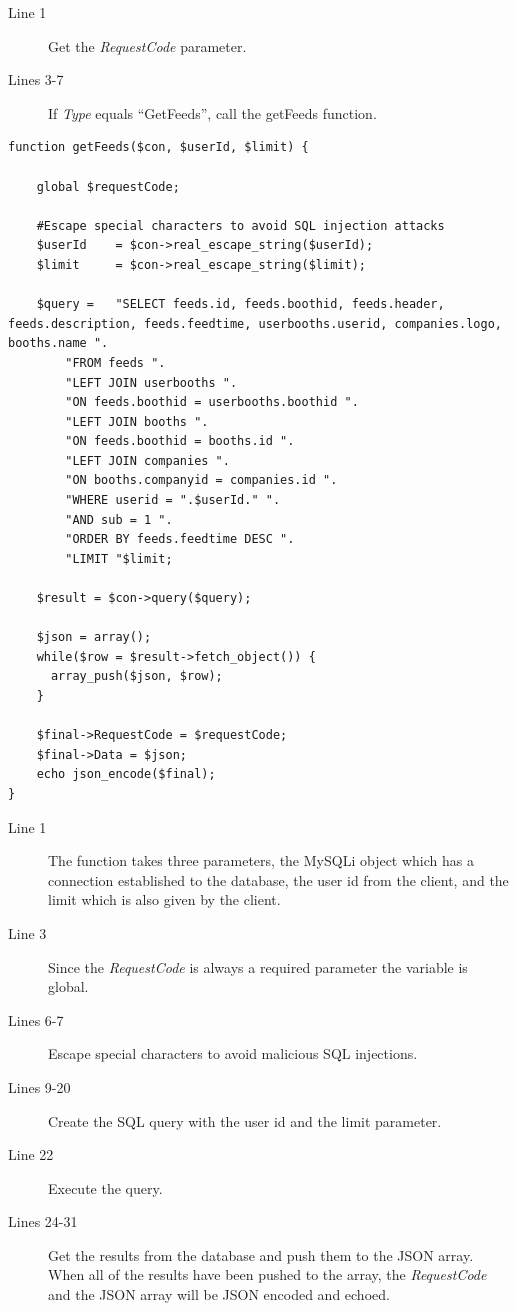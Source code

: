 \begin{description}
\item[Line 1] Get the \textit{RequestCode} parameter.
\item[Lines 3-7] If \textit{Type} equals ``GetFeeds'', call the getFeeds function.
\end{description}


\begin{lstlisting}[language=phpstyle, label=lst:getFeeds, caption={getFeeds function}]
function getFeeds($con, $userId, $limit) {

    global $requestCode;

    #Escape special characters to avoid SQL injection attacks
    $userId    = $con->real_escape_string($userId);
    $limit     = $con->real_escape_string($limit);

    $query =   "SELECT feeds.id, feeds.boothid, feeds.header, feeds.description, feeds.feedtime, userbooths.userid, companies.logo, booths.name ".
        "FROM feeds ".
        "LEFT JOIN userbooths ".
        "ON feeds.boothid = userbooths.boothid ".
        "LEFT JOIN booths ".
        "ON feeds.boothid = booths.id ".
        "LEFT JOIN companies ".
        "ON booths.companyid = companies.id ".
        "WHERE userid = ".$userId." ".
        "AND sub = 1 ".
        "ORDER BY feeds.feedtime DESC ".
        "LIMIT "$limit;

    $result = $con->query($query);

    $json = array();
    while($row = $result->fetch_object()) {
      array_push($json, $row);
    }
    
    $final->RequestCode = $requestCode;
    $final->Data = $json;
    echo json_encode($final);
}
\end{lstlisting}

\begin{description}
\item[Line 1] The function takes three parameters, the MySQLi object which has a connection
  established to the database, the user id from the client, and the limit which is also given by the client.
\item[Line 3] Since the \textit{RequestCode} is always a required parameter the variable is global.
\item[Lines 6-7] Escape special characters to avoid malicious SQL injections.
\item[Lines 9-20] Create the SQL query with the user id and the limit parameter.
\item[Line 22] Execute the query.
\item[Lines 24-31] Get the results from the database and push them to the JSON array. When
  all of the results have been pushed to the array, the \textit{RequestCode} and the JSON array will be JSON encoded and echoed.
\end{description}

